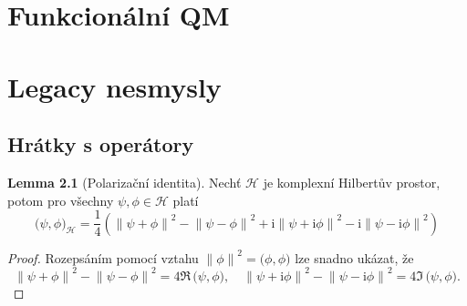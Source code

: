 \documentclass[10pt,a4paper]{report}
\theoremstyle{definition}
\newtheorem{lemma}[theorem]{Lemma}
\newcommand{\const}[1]{\mathrm{#1}}
\newcommand{\norm}[1]{\left\lVert#1\right\rVert}
\newcommand{\innerprod}[2]{\big( #1, #2 \big)}
\newcommand{\I}{\const{i}}
\def\H{\mathcal{H}}
\begin{document}
\pagebreak

\chapter{Funkcionální QM}\label{chapter-vonneumann}

\chapter{Legacy nesmysly}
\section{Hrátky s operátory}
\begin{lemma}[Polarizační identita]
    \label{polarizacni-identita}
    Nechť $\H$ je komplexní Hilbertův prostor, potom pro všechny $\psi, \phi \in \H$ platí
    \begin{equation*}
        \innerprod{\psi}{\phi}_\H
        =
        \frac{1}{4}
        \left(
            \norm{\psi + \phi}^2
            - \norm{\psi - \phi}^2
            + \I \norm{\psi + \I \phi}^2
            - \I \norm{\psi - \I \phi}^2
        \right)
    \end{equation*}
\end{lemma}
\begin{proof}
    Rozepsáním pomocí vztahu $\norm{\phi}^2 = \innerprod{\phi}{\phi}$ lze snadno ukázat, že
    \begin{equation*}
        \norm{\psi + \phi}^2 - \norm{\psi - \phi}^2
        = 4 \Re \, \innerprod{\psi}{\phi},
        \quad
        \norm{\psi + \I\phi}^2 - \norm{\psi - \I\phi}^2
        = 4 \Im \, \innerprod{\psi}{\phi}.
    \end{equation*}
\end{proof}
\end{document}
